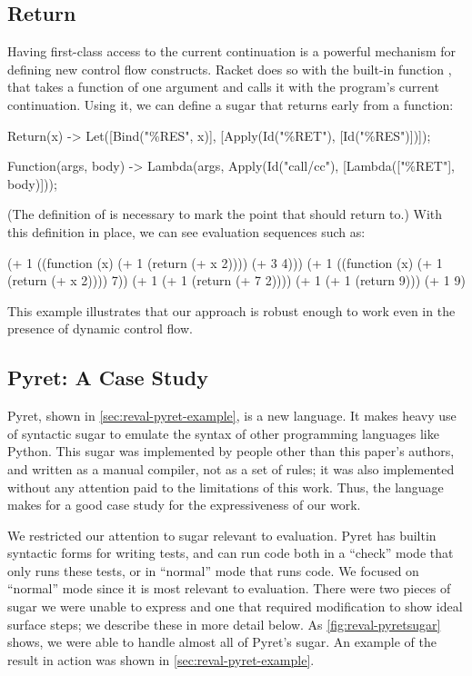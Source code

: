 \subsection{Return}
  Having first-class access to the current continuation is a powerful
  mechanism for defining new control flow constructs. Racket does so with
  the built-in function , that takes a function of one
  argument and calls it with the program's current continuation. Using it,
  we can define a  sugar that returns early from a function:
  \begin{Codes}
  Return(x) ->
    Let([Bind("\%RES", x)],
        [Apply(Id("\%RET"), [Id("\%RES")])]);

  Function(args, body) ->
    Lambda(args, Apply(Id("call/cc"),
                       [Lambda(["\%RET"], body)]));
  \end{Codes}
  (The definition of  is necessary to mark the point that
   should return to.) With this definition in place, we can
  see evaluation sequences such as:
  \begin{Codes}
    (+ 1 ((function (x) (+ 1 (return (+ x 2)))) (+ 3 4)))
\SurfStep (+ 1 ((function (x) (+ 1 (return (+ x 2)))) 7))
\SurfStep (+ 1 (+ 1 (return (+ 7 2))))
\SurfStep (+ 1 (+ 1 (return 9)))
\SurfStep (+ 1 9)
  \end{Codes}
  This example illustrates that our approach is robust enough to work even
  in the presence of dynamic control flow.


\subsection{Pyret: A Case Study}
\label{sec:reval-pyret}

Pyret, shown in \cref{sec:reval-pyret-example}, is a new language. It makes
heavy use of syntactic sugar to emulate the syntax of other programming
languages like Python. This sugar was implemented by people other than
this paper's authors, and written as a manual compiler, not as a set
of rules; it was also implemented without any attention paid to the
limitations of this work. Thus, the language makes for a good case
study for the expressiveness of our work.

We restricted our attention to sugar relevant to evaluation. Pyret has
builtin syntactic forms for writing tests, and can run code both in a
``check'' mode that only runs these tests, or in ``normal'' mode that runs
code. We focused on ``normal'' mode since it is most
relevant to evaluation. There were two pieces of sugar we
were unable to express and one that
required modification to show ideal surface steps; we
describe these in more detail below. 
As \cref{fig:reval-pyretsugar} shows, we were able to handle almost all
of Pyret's sugar. An example of the result in action was shown in
\cref{sec:reval-pyret-example}.

